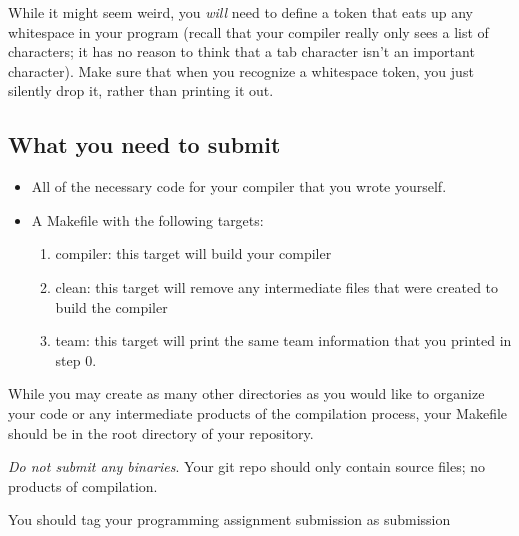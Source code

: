 \documentclass{article}
\begin{document}
While it might seem weird, you {\em will} need to define a token that eats up any whitespace in your program (recall that your compiler really only sees a list of characters; it has no reason to think that a tab character isn't an important character). Make sure that when you recognize a whitespace token, you just silently drop it, rather than printing it out.

\subsection{What you need to submit}
\begin{itemize}
	\item All of the necessary code for your compiler that you wrote yourself. 

	\item A Makefile with the following targets:
		\begin{enumerate}
			\item compiler: this target will build your compiler
			\item clean: this target will remove any intermediate files that were created to build the compiler
			\item team: this target will print the same team information that you printed in step 0.
		\end{enumerate}
\end{itemize}

While you may create as many other directories as you would like to organize your code or any intermediate products of the compilation process, your \textsf{Makefile} should be in the root directory of your repository.

{\em Do not submit any binaries}. Your git repo should only contain source files; no products of compilation.

You should tag your programming assignment submission as \textsf{submission}
\end{document}
